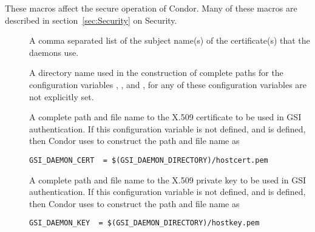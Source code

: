 These macros affect the secure operation of Condor.
Many of these macros are described in
section~\ref{sec:Security} on Security.

\begin{description}
\item[]
\label{param:SecAuthentication} \Todo

\item[]
\label{param:SecEncryption} \Todo

\item[]
\label{param:SecIntegrity} \Todo

\item[]
\label{param:SecNegotiation} \Todo

\item[]
\label{param:SecAuthenticationMethods} \Todo

\item[]
\label{param:SecCryptoMethods} \Todo

\item[]
\label{param:GSIDaemonName} A comma separated list of the subject
name(s) of the certificate(s) that the daemons use.

\item[]
\label{param:GSIDaemonDirectory} A directory name used in the
construction of complete paths for the configuration variables
,
, and
,
for any of these configuration variables are not explicitly set.

\item[]
\label{param:GSIDaemonCert} A complete path and file name to the
X.509 certificate to be used in GSI authentication.
If this configuration variable is not defined, and
 is defined, then Condor uses
 to construct the path and file name as
\begin{verbatim}
GSI_DAEMON_CERT  = $(GSI_DAEMON_DIRECTORY)/hostcert.pem
\end{verbatim}

\item[]
\label{param:GSIDaemonKey}  A complete path and file name to the
X.509 private key to be used in GSI authentication.
If this configuration variable is not defined, and
 is defined, then Condor uses
 to construct the path and file name as
\begin{verbatim}
GSI_DAEMON_KEY  = $(GSI_DAEMON_DIRECTORY)/hostkey.pem
\end{verbatim}


\end{description}
